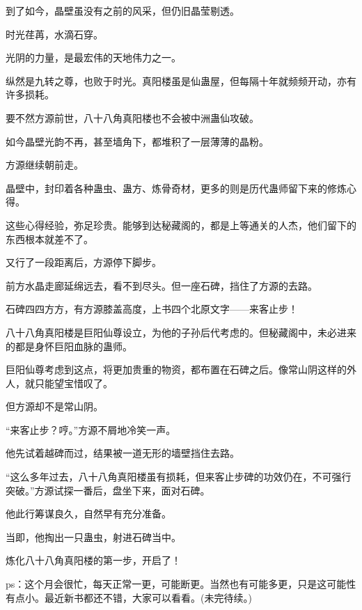 \begin{this_body}
到了如今，晶壁虽没有之前的风采，但仍旧晶莹剔透。

时光荏苒，水滴石穿。

光阴的力量，是最宏伟的天地伟力之一。

纵然是九转之尊，也败于时光。真阳楼虽是仙蛊屋，但每隔十年就频频开动，亦有许多损耗。

要不然方源前世，八十八角真阳楼也不会被中洲蛊仙攻破。

如今晶壁光韵不再，甚至墙角下，都堆积了一层薄薄的晶粉。

方源继续朝前走。

晶壁中，封印着各种蛊虫、蛊方、炼骨奇材，更多的则是历代蛊师留下来的修炼心得。

这些心得经验，弥足珍贵。能够到达秘藏阁的，都是上等通关的人杰，他们留下的东西根本就差不了。

又行了一段距离后，方源停下脚步。

前方水晶走廊延绵远去，看不到尽头。但一座石碑，挡住了方源的去路。

石碑四四方方，有方源膝盖高度，上书四个北原文字——来客止步！

八十八角真阳楼是巨阳仙尊设立，为他的子孙后代考虑的。但秘藏阁中，未必进来的都是身怀巨阳血脉的蛊师。

巨阳仙尊考虑到这点，将更加贵重的物资，都布置在石碑之后。像常山阴这样的外人，就只能望宝惜叹了。

但方源却不是常山阴。

“来客止步？哼。”方源不屑地冷笑一声。

他先试着越碑而过，结果被一道无形的墙壁挡住去路。

“这么多年过去，八十八角真阳楼虽有损耗，但来客止步碑的功效仍在，不可强行突破。”方源试探一番后，盘坐下来，面对石碑。

他此行筹谋良久，自然早有充分准备。

当即，他掏出一只蛊虫，射进石碑当中。

炼化八十八角真阳楼的第一步，开启了！

ps：这个月会很忙，每天正常一更，可能断更。当然也有可能多更，只是这可能性有点小。最近新书都还不错，大家可以看看。(未完待续。)

\end{this_body}

